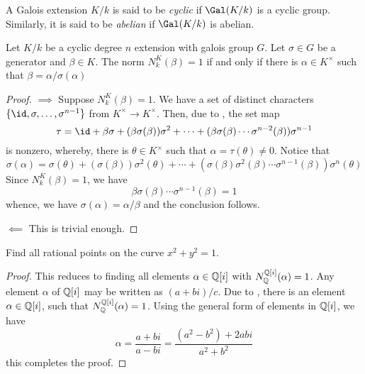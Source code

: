 \begin{definition}
    A Galois extension $K/k$ is said to be \emph{cyclic} if $\Gal(K/k)$ is a cyclic group. Similarly, it is said to be \emph{abelian} if $\Gal(K/k)$ is abelian.
\end{definition}

\begin{theorem}
    
\end{theorem}

\begin{theorem}
    Let $K/k$ be a cyclic degree $n$ extension with galois group $G$. Let $\sigma\in G$ be a generator and $\beta\in K$. The norm $N^K_k(\beta) = 1$ if and only if there is $\alpha\in K^\times$ such that $\beta = \alpha/\sigma(\alpha)$
\end{theorem}
\begin{proof}
    $\implies$ Suppose $N^K_k(\beta) = 1$. We have a set of distinct characters $\{\id,\sigma,\ldots,\sigma^{n - 1}\}$ from $K^\times\to K^\times$. Then, due to , the set map 
    \begin{equation*}
        \tau = \id + \beta\sigma + (\beta\sigma(\beta))\sigma^2 + \cdots + (\beta\sigma(\beta)\cdots\sigma^{n - 2}(\beta))\sigma^{n - 1}
    \end{equation*}
    is nonzero, whereby, there is $\theta\in K^\times$ such that $\alpha = \tau(\theta)\ne 0$. Notice that 
    \begin{equation*}
        \sigma(\alpha) = \sigma(\theta) + (\sigma(\beta))\sigma^2(\theta) + \cdots + (\sigma(\beta)\sigma^2(\beta)\cdots\sigma^{n - 1}(\beta))\sigma^n(\theta)
    \end{equation*}
    Since $N^K_k(\beta) = 1$, we have 
    \begin{equation*}
        \beta\sigma(\beta)\cdots\sigma^{n - 1}(\beta) = 1
    \end{equation*}
    whence, we have $\sigma(\alpha) = \alpha/\beta$ and the conclusion follows.

    $\impliedby$ This is trivial enough.
\end{proof}

\begin{example}
    Find all rational points on the curve $x^2 + y^2 = 1$.
\end{example}
\begin{proof}
    This reduces to finding all elements $\alpha\in\mathbb{Q}[i]$ with $N^{\mathbb{Q}[i]}_{\mathbb{Q}}(\alpha) = 1$. Any element $\alpha$ of $\mathbb{Q}[i]$ may be written as $(a + bi)/c$. Due to , there is an element $\alpha\in\mathbb{Q}[i]$, such that $N^{\mathbb{Q}[i]}_{\mathbb{Q}}(\alpha) = 1$. Using the general form of elements in $\mathbb{Q}[i]$, we have 
    \begin{equation*}
        \alpha = \frac{a + bi}{a - bi} = \frac{(a^2 - b^2) + 2abi}{a^2 + b^2}
    \end{equation*}
    this completes the proof.
\end{proof}